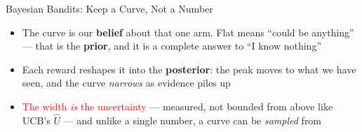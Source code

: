 \begin{frame}{Bayesian Bandits: Keep a Curve, Not a Number}
\vspace{-0.3em}
\begin{center}
\end{center}
\vspace{-0.3em}
\begin{itemize}
    \setlength{\itemsep}{0.3em}
    \item The curve is our \textbf{belief} about that one arm. Flat means ``could be anything'' --- that is the \textbf{prior}, and it is a complete answer to ``I know nothing''
    \item Each reward reshapes it into the \textbf{posterior}: the peak moves to what we have seen, and the curve \emph{narrows} as evidence piles up
    \item \textcolor{red}{The width \emph{is} the uncertainty} --- measured, not bounded from above like UCB's $\hat{U}$ --- and unlike a single number, a curve can be \emph{sampled} from
\end{itemize}
\end{frame}


